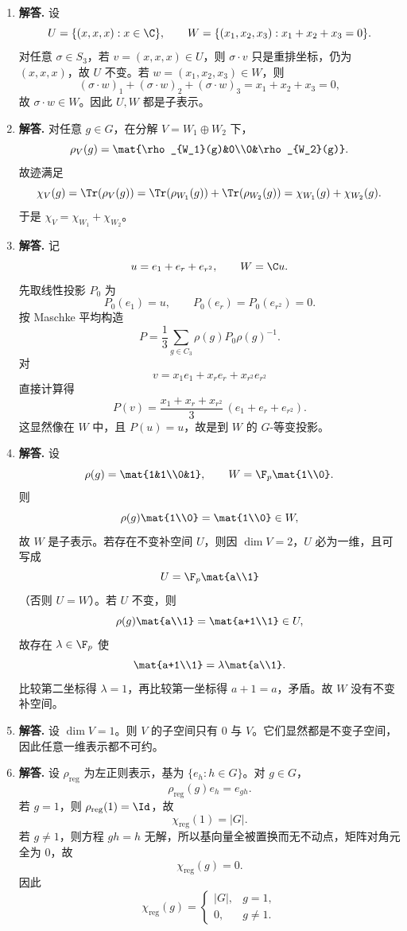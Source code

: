 \begin{enumerate}[label=\textbf{\arabic*.}, leftmargin=*, itemsep=1em]
\item \textbf{解答.} 设
\[
U=\{(x,x,x):x\in\C\},\qquad
W=\{(x_1,x_2,x_3):x_1+x_2+x_3=0\}.
\]
对任意 $\sigma\in S_3$，若 $v=(x,x,x)\in U$，则 $\sigma\cdot v$ 只是重排坐标，仍为 $(x,x,x)$，故 $U$ 不变。若 $w=(x_1,x_2,x_3)\in W$，则
\[
(\sigma\cdot w)_1+(\sigma\cdot w)_2+(\sigma\cdot w)_3=x_1+x_2+x_3=0,
\]
故 $\sigma\cdot w\in W$。因此 $U,W$ 都是子表示。

\item \textbf{解答.} 对任意 $g\in G$，在分解 $V=W_1\oplus W_2$ 下，
\[
\rho_V(g)=\mat{\rho_{W_1}(g)&0\\0&\rho_{W_2}(g)}.
\]
故迹满足
\[
\chi_V(g)=\Tr(\rho_V(g))
=\Tr(\rho_{W_1}(g))+\Tr(\rho_{W_2}(g))
=\chi_{W_1}(g)+\chi_{W_2}(g).
\]
于是 $\chi_V=\chi_{W_1}+\chi_{W_2}$。

\item \textbf{解答.} 记
\[
u=e_1+e_r+e_{r^2},\qquad W=\C u.
\]
先取线性投影 $P_0$ 为
\[
P_0(e_1)=u,\qquad P_0(e_r)=P_0(e_{r^2})=0.
\]
按 Maschke 平均构造
\[
P=\frac13\sum_{g\in C_3}\rho(g)P_0\rho(g)^{-1}.
\]
对
\[
v=x_1e_1+x_re_r+x_{r^2}e_{r^2}
\]
直接计算得
\[
P(v)=\frac{x_1+x_r+x_{r^2}}{3}\,(e_1+e_r+e_{r^2}).
\]
这显然像在 $W$ 中，且 $P(u)=u$，故是到 $W$ 的 $G$-等变投影。

\item \textbf{解答.} 设
\[
\rho(g)=\mat{1&1\\0&1},\qquad W=\F_p\mat{1\\0}.
\]
则
\[
\rho(g)\mat{1\\0}=\mat{1\\0}\in W,
\]
故 $W$ 是子表示。若存在不变补空间 $U$，则因 $\dim V=2$，$U$ 必为一维，且可写成
\[
U=\F_p\mat{a\\1}
\]
（否则 $U=W$）。若 $U$ 不变，则
\[
\rho(g)\mat{a\\1}=\mat{a+1\\1}\in U,
\]
故存在 $\lambda\in\F_p$ 使
\[
\mat{a+1\\1}=\lambda\mat{a\\1}.
\]
比较第二坐标得 $\lambda=1$，再比较第一坐标得 $a+1=a$，矛盾。故 $W$ 没有不变补空间。

\item \textbf{解答.} 设 $\dim V=1$。则 $V$ 的子空间只有 $0$ 与 $V$。它们显然都是不变子空间，因此任意一维表示都不可约。

\item \textbf{解答.} 设 $\rho_{\mathrm{reg}}$ 为左正则表示，基为 $\{e_h:h\in G\}$。对 $g\in G$，
\[
\rho_{\mathrm{reg}}(g)e_h=e_{gh}.
\]
若 $g=1$，则 $\rho_{\mathrm{reg}}(1)=\Id$，故
\[
\chi_{\mathrm{reg}}(1)=|G|.
\]
若 $g\neq1$，则方程 $gh=h$ 无解，所以基向量全被置换而无不动点，矩阵对角元全为 $0$，故
\[
\chi_{\mathrm{reg}}(g)=0.
\]
因此
\[
\chi_{\mathrm{reg}}(g)=
\begin{cases}
|G|,& g=1,\\
0,& g\neq1.
\end{cases}
\]


\end{enumerate}
